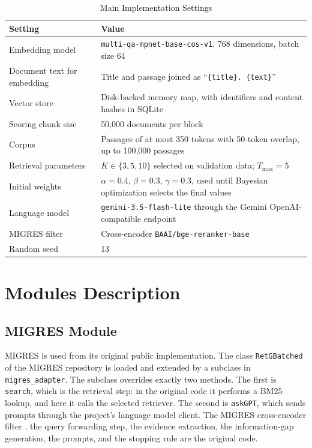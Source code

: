 \documentclass[12pt,a4paper]{report}
\begin{document}
\begin{table}[H]
\centering
\caption{Main Implementation Settings}
\label{tab:impl-config}
\renewcommand{\arraystretch}{1.2}
\begin{tabular}{|p{1.9in}|p{4.15in}|}
\hline
\textbf{Setting} & \textbf{Value} \\ \hline
Embedding model & \texttt{multi-qa-mpnet-base-cos-v1}, 768 dimensions, batch size 64 \\ \hline
Document text for embedding & Title and passage joined as ``\texttt{\{title\}. \{text\}}'' \\ \hline
Vector store & Disk-backed memory map, with identifiers and content hashes in SQLite \\ \hline
Scoring chunk size & 50,000 documents per block \\ \hline
Corpus & Passages of at most 350 tokens with 50-token overlap, up to 100,000 passages \\ \hline
Retrieval parameters & $K\in\{3,5,10\}$ selected on validation data; $T_{\max}=5$ \\ \hline
Initial weights & $\alpha=0.4$, $\beta=0.3$, $\gamma=0.3$, used until Bayesian optimization selects the final values \\ \hline
Language model & \texttt{gemini-3.5-flash-lite} through the Gemini OpenAI-compatible endpoint \cite{gemini2023} \\ \hline
MIGRES filter & Cross-encoder \texttt{BAAI/bge-reranker-base} \cite{xiao2024cpack,nogueira2019passage} \\ \hline
Random seed & 13 \\ \hline
\end{tabular}
\end{table}

\section{Modules Description}

\subsection{MIGRES Module}

MIGRES is used from its original public implementation. The class \texttt{RetGBatched} of the MIGRES repository \cite{wang2025migres} is loaded and extended by a subclass in \texttt{migres\_adapter}. The subclass overrides exactly two methods. The first is \texttt{search}, which is the retrieval step: in the original code it performs a BM25 lookup, and here it calls the selected retriever. The second is \texttt{askGPT}, which sends prompts through the project's language model client. The MIGRES cross-encoder filter \cite{nogueira2019passage}, the query forwarding step, the evidence extraction, the information-gap generation, the prompts, and the stopping rule are the original code.
\end{document}
